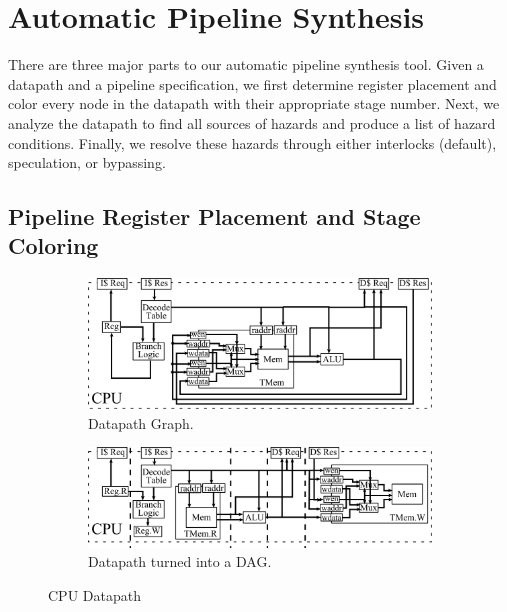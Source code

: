 \section{Automatic Pipeline Synthesis}
There are three major parts to our automatic pipeline synthesis
tool. Given a datapath and a pipeline specification, we first
determine register placement and color every node in the datapath with
their appropriate stage number. Next, we analyze the datapath to find
all sources of hazards and produce a list of hazard
conditions. Finally, we resolve these hazards through either
interlocks (default), speculation, or bypassing.

\subsection{Pipeline Register Placement and Stage Coloring}
\begin{figure}[htb]
\centering
  \begin{subfigure}[t]{0.8\textwidth}
  \centering
  \includegraphics[width=\textwidth]{figures/pipeline.pdf}
  \caption{Datapath Graph.}
  \label{fig:datapathgrah}
  \end{subfigure}
  \begin{subfigure}[t]{0.8\textwidth}
  \vspace{20pt}
  \centering
  \includegraphics[width=\textwidth]{figures/pipelinedag.pdf}
  \caption{Datapath turned into a DAG.}
  \label{fig:datapathdag}
  \end{subfigure}
\caption{CPU Datapath}
\label{fig:datapath}
\end{figure}

